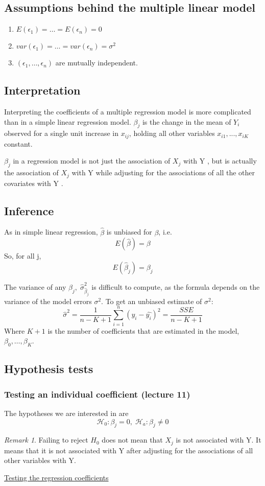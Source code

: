 \documentclass[12pt]{article}
\theoremstyle{definition}
\theoremstyle{remark}
\newtheorem*{remark}{Remark}
\begin{document}
\subsection{Assumptions behind the multiple linear model}
\begin{enumerate}
    \item $E(\epsilon_1) =\hdots = E(\epsilon_n) = 0$
    \item $var(\epsilon_1) = \hdots = var(\epsilon_n) = \sigma^2$
    \item $(\epsilon_1, \hdots, \epsilon_n)$ are mutually independent. 

\end{enumerate}
\subsection{Interpretation}
Interpreting the coefficients of a multiple regression model is more complicated than in a simple linear regression model.
$\beta_j$ is the change in the mean of $Y_i$ observed for a single unit increase in $x_{ij}$, holding all other variables $x_{i1},...,x_{iK}$ constant.

$\beta_j$ in a regression model is not just the association of $X_j$ with Y , but is actually the association of $X_j$ with Y while adjusting for the associations of all the other covariates with Y .

\subsection{Inference}
As in simple linear regression, $\hat{\beta}$ is unbiased for $\beta$, i.e. $$E(\hat{\beta}) = \beta$$
So, for all j, $$E(\hat{\beta}_j) = \beta_j$$


The variance of any $\hat{\beta}_j,\; \hat{\sigma}^2_{\hat{\beta}_j}$ is difficult to compute, as the formula depends on the variance of the
model errors $\sigma^2$. 
To get an unbiased estimate of $\sigma^2$:
$$\hat{\sigma}^2 = \frac{1}{n-K+1} \sum^n_{i=1}(y_i - \hat{y_i})^2 = \frac{SSE}{n-K+1} $$
Where $K + 1$ is the number of coefficients that are estimated in
the model, $\beta_0, \hdots, \beta_K$.


\subsection{Hypothesis tests}

\subsubsection{Testing an individual coefficient (lecture 11)}
    The hypotheses we are interested in are 
    $$\mathcal{H}_0 :\beta_j = 0, \; \mathcal{H}_a : \beta_j \neq 0$$
    \begin{remark}
        Failing to reject $H_0$ does not mean that $X_j$ is not associated with Y. It means that it is not associated with Y after adjusting for the associations of all other variables with Y.
    \end{remark}
 \href{https://ecampusontario.pressbooks.pub/introstats/chapter/13-6-testing-the-regression-coefficients/}{Testing the regression coefficients}
    
\end{document}
